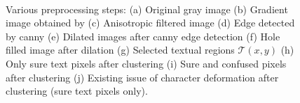 \documentclass[runningheads]{llncs}
\begin{document}
\begin{figure}[h]
	~%
	\begin{subfigure}[b]{0.24\textwidth}
		\centering {}
		\caption{}
		\label{image_text_9}
	\end{subfigure}	 
	\centering	 
	\begin{subfigure}[b]{0.24\textwidth}
		\centering {}
		\caption{}
		\label{image_text_1}
	\end{subfigure}       
	\caption[startProcess]{Various preprocessing steps: (a) Original gray image (b) Gradient image obtained by \cite{Dollar2013} (c) Anisotropic filtered image (d) Edge detected by canny  (e) Dilated images after canny edge detection (f) Hole filled image after dilation (g) Selected textual regions $\mathcal{T}(x,y)$ (h) Only sure text pixels after clustering  (i) Sure and confused pixels after clustering (j) Existing issue of character deformation after clustering (sure text pixels only).  }
	\label{allPreprocessing}
\end{figure}
\end{document}
